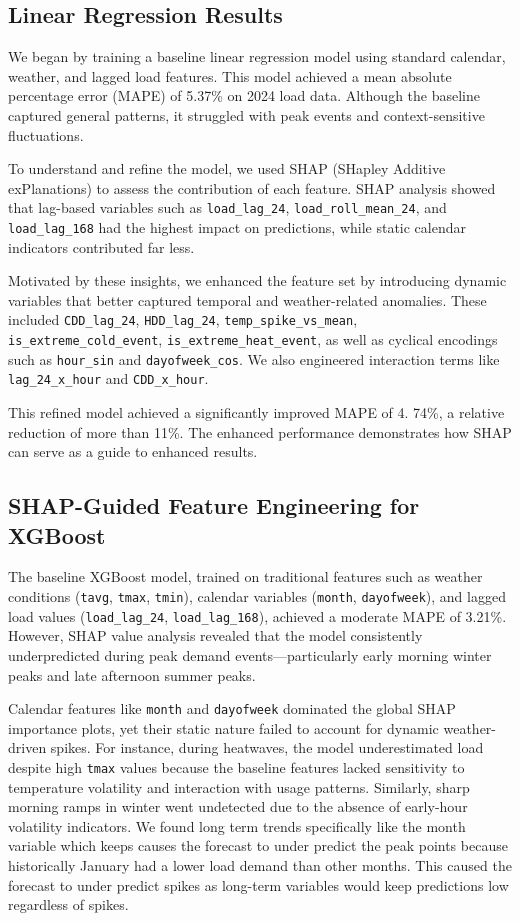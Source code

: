 \documentclass{ifacconf}
\begin{document}
\subsection{Linear Regression Results}
We began by training a baseline linear regression model using standard calendar, weather, and lagged load features. This model achieved a mean absolute percentage error (MAPE) of 5.37\% on 2024 load data. Although the baseline captured general patterns, it struggled with peak events and context-sensitive fluctuations.

To understand and refine the model, we used SHAP (SHapley Additive exPlanations) to assess the contribution of each feature. SHAP analysis showed that lag-based variables such as \texttt{load_lag_24}, \texttt{load_roll_mean_24}, and \texttt{load_lag_168} had the highest impact on predictions, while static calendar indicators contributed far less.

Motivated by these insights, we enhanced the feature set by introducing dynamic variables that better captured temporal and weather-related anomalies. These included \texttt{CDD_lag_24}, \texttt{HDD_lag_24}, \texttt{temp_spike_vs_mean}, \texttt{is_extreme_cold_event}, \texttt{is_extreme_heat_event}, as well as cyclical encodings such as \texttt{hour_sin} and \texttt{dayofweek_cos}. We also engineered interaction terms like \texttt{lag_24_x_hour} and \texttt{CDD_x_hour}.

This refined model achieved a significantly improved MAPE of 4. 74\%, a relative reduction of more than 11\%. The enhanced performance demonstrates how SHAP can serve as a guide to enhanced results.

\subsection{SHAP-Guided Feature Engineering for XGBoost}

The baseline XGBoost model, trained on traditional features such as weather conditions (\texttt{tavg}, \texttt{tmax}, \texttt{tmin}), calendar variables (\texttt{month}, \texttt{dayofweek}), and lagged load values (\texttt{load\_lag\_24}, \texttt{load\_lag\_168}), achieved a moderate MAPE of 3.21\%. However, SHAP value analysis revealed that the model consistently underpredicted during peak demand events—particularly early morning winter peaks and late afternoon summer peaks.

Calendar features like \texttt{month} and \texttt{dayofweek} dominated the global SHAP importance plots, yet their static nature failed to account for dynamic weather-driven spikes. For instance, during heatwaves, the model underestimated load despite high \texttt{tmax} values because the baseline features lacked sensitivity to temperature volatility and interaction with usage patterns. Similarly, sharp morning ramps in winter went undetected due to the absence of early-hour volatility indicators. We found long term trends specifically like the month variable which keeps causes the forecast to under predict the peak points because historically January had a lower load demand than other months. This caused the forecast to under predict spikes as long-term variables would keep predictions low regardless of spikes.
\end{document}

